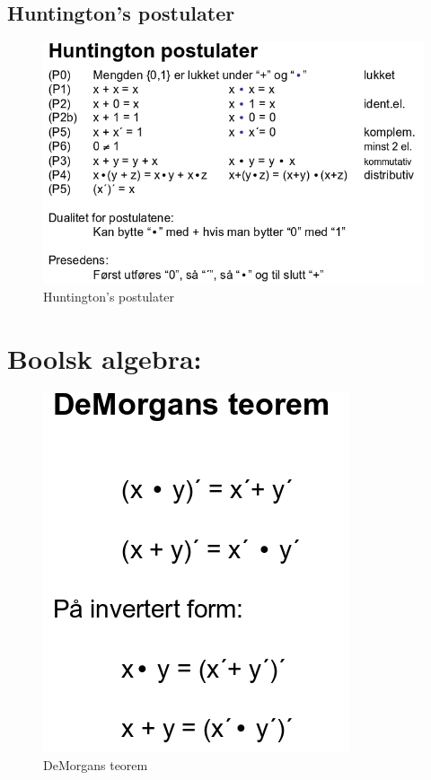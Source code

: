 \documentclass{article}
\begin{document}
	\subsection*{Huntington's postulater}
	\begin{figure}[H]
		\includegraphics[scale=0.35]{Huntington.png}
		\caption{Huntington's postulater}
	\end{figure}
	
	
	\section*{Boolsk algebra:}
	
	\begin{figure}[H]
		\includegraphics[scale=0.4]{DeMorgan.png}
		\caption{DeMorgans teorem}
	\end{figure}
	
\end{document}
